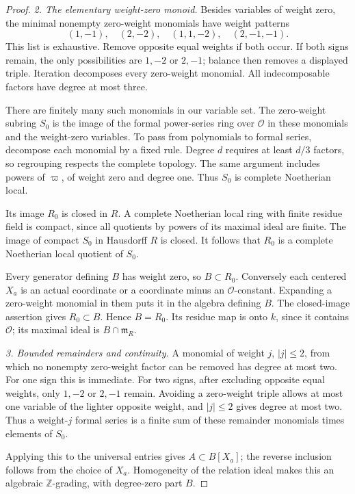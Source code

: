 \begin{proof}
\emph{2. The elementary weight-zero monoid.}
Besides variables of weight zero, the minimal nonempty
zero-weight monomials have weight patterns
\[
 (1,-1),\quad(2,-2),\quad(1,1,-2),\quad(2,-1,-1).
 \tag{G95.6}
\]
This list is exhaustive.  Remove opposite equal weights
if both occur.  If both signs remain, the only possibilities
are \(1,-2\) or \(2,-1\); balance then removes a displayed
triple.  Iteration decomposes every zero-weight monomial.
All indecomposable factors have degree at most three.

There are finitely many such monomials in our variable set.
The zero-weight subring \(S_0\) is the image of the formal
power-series ring over \(\mathcal O\) in these monomials and
the weight-zero variables.
To pass from polynomials to formal series, decompose each
monomial by a fixed rule.  Degree \(d\) requires at least
\(d/3\) factors, so regrouping respects the complete topology.
The same argument includes powers of \(\varpi\), of weight
zero and degree one.  Thus \(S_0\) is complete Noetherian local.

Its image \(R_0\) is closed in \(R\).
A complete Noetherian local ring with finite residue field
is compact, since all quotients by powers of its maximal
ideal are finite.  The image of compact \(S_0\) in Hausdorff
\(R\) is closed.  It follows that \(R_0\) is a complete
Noetherian local quotient of \(S_0\).

Every generator defining \(B\) has weight zero, so
\(B\subset R_0\).  Conversely each centered \(X_a\) is an
actual coordinate or a coordinate minus an \(\mathcal O\)-constant.
Expanding a zero-weight monomial in them puts it in the
algebra defining \(B\).  The closed-image assertion gives
\(R_0\subset B\).  Hence \(B=R_0\).
Its residue map is onto \(k\), since it contains \(\mathcal O\);
its maximal ideal is \(B\cap\mathfrak m_R\).

\emph{3. Bounded remainders and continuity.}
A monomial of weight \(j\), \(|j|\leq2\), from which no
nonempty zero-weight factor can be removed has degree at
most two.  For one sign this is immediate.
For two signs, after excluding opposite equal weights,
only \(1,-2\) or \(2,-1\) remain.
Avoiding a zero-weight triple allows at most one variable
of the lighter opposite weight, and \(|j|\leq2\) gives
degree at most two.
Thus a weight-\(j\) formal series is a finite sum of these
remainder monomials times elements of \(S_0\).

Applying this to the universal entries gives
\(A\subset B[X_a]\); the reverse inclusion follows from
the choice of \(X_a\).
Homogeneity of the relation ideal makes this an algebraic
\(\mathbb Z\)-grading, with degree-zero part \(B\).


\end{proof}
